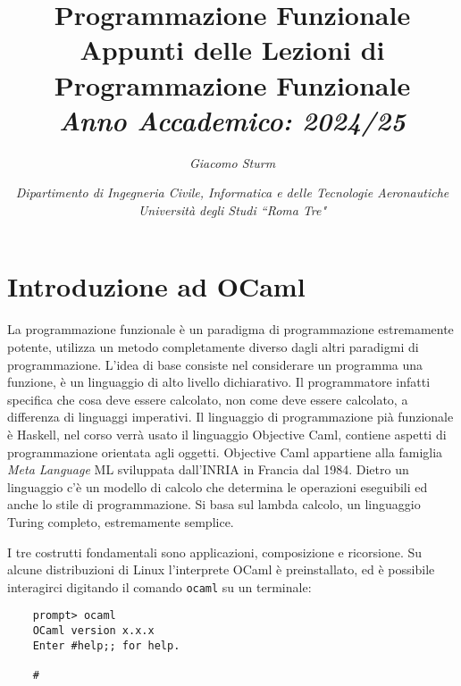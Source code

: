 \documentclass{article}
\numberwithin{equation}{subsection}
\begin{document}
\title{%
    \textbf{Programmazione Funzionale}  \\ 
    \large Appunti delle Lezioni di Programmazione Funzionale \\
    \textit{Anno Accademico: 2024/25}}
\author{\textit{Giacomo Sturm}}
\date{\textit{Dipartimento di Ingegneria Civile, Informatica e delle Tecnologie Aeronautiche \\
Università degli Studi ``Roma Tre"}}

\maketitle
\thispagestyle{link}

\clearpage


\pagestyle{fancy}
\fancyhead{}\fancyfoot{}
\fancyfoot[C]{\thepage}

\tableofcontents

\clearpage
{}


\section{Introduzione ad OCaml}

La programmazione funzionale è un paradigma di programmazione estremamente potente, utilizza un metodo completamente diverso dagli altri paradigmi di programmazione. L'idea di base consiste nel considerare un programma una funzione, è un linguaggio di alto livello dichiarativo. Il programmatore infatti specifica che cosa deve essere calcolato, non come deve essere calcolato, a differenza di linguaggi imperativi.  
Il linguaggio di programmazione pià funzionale è Haskell, nel corso verrà usato il linguaggio Objective Caml, contiene aspetti di programmazione orientata agli oggetti. 
Objective Caml appartiene alla famiglia \textit{Meta Language} ML sviluppata dall'INRIA in Francia dal 1984. 
Dietro un linguaggio c'è un modello di calcolo che determina le operazioni eseguibili ed anche lo stile di programmazione. 
Si basa sul lambda calcolo, un linguaggio Turing completo, estremamente semplice. 

I tre costrutti fondamentali sono applicazioni, composizione e ricorsione. Su alcune distribuzioni di Linux l'interprete OCaml è preinstallato, ed è possibile interagirci digitando il comando \verb|ocaml| su un terminale:
\begin{verbatim}
    prompt> ocaml
    OCaml version x.x.x
    Enter #help;; for help.

    #
\end{verbatim}
\end{document}
